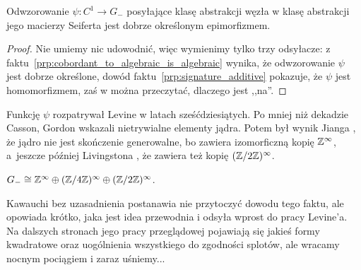 \begin{proposition}
    Odwzorowanie $\psi \colon C^1 \to G_-$ posyłające klasę abstrakcji węzła w klasę abstrakcji jego macierzy Seiferta jest dobrze określonym epimorfizmem.
\end{proposition}

\begin{proof}
    Nie umiemy nic udowodnić, więc wymienimy tylko trzy odsyłacze: z faktu~\ref{prp:cobordant_to_algebraic_is_algebraic} wynika, że odwzorowanie $\psi$ jest dobrze określone, dowód faktu~\ref{prp:signature_additive} pokazuje, że $\psi$ jest homomorfizmem, zaś w \cite[s. 62]{kawauchi1996} można przeczytać, dlaczego jest ,,na''.
\end{proof}

Funkcję $\psi$ rozpatrywał Levine \cite{levine1969} w latach sześćdziesiątych.
%
Po mniej niż dekadzie Casson, Gordon \cite{casson1978} wskazali nietrywialne elementy jądra.
%
%
Potem był wynik Jianga \cite{jiang1981}, że jądro nie jest skończenie generowalne, bo zawiera izomorficzną kopię $\mathbb Z^\infty$, a~jeszcze później Livingstona \cite{livingston1999}, że zawiera też kopię $(\mathbb Z/2\mathbb Z)^\infty$.

\begin{proposition}
    $G_- \cong \mathbb Z^\infty \oplus (\mathbb Z/4\mathbb Z)^\infty \oplus (\mathbb Z/2\mathbb Z)^\infty$.
\end{proposition}

Kawauchi \cite[s. 161]{kawauchi1996} bez uzasadnienia postanawia nie przytoczyć dowodu tego faktu, ale opowiada krótko, jaka jest idea przewodnia i odsyła wprost do pracy Levine'a.
Na dalszych stronach jego pracy przeglądowej pojawiają się jakieś formy kwadratowe oraz uogólnienia wszystkiego do zgodności splotów, ale wracamy nocnym pociągiem i zaraz uśniemy...

